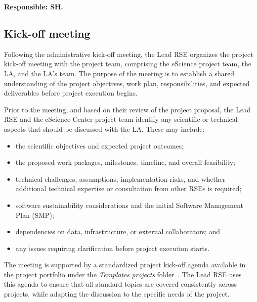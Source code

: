 \textbf{Responsible: SH.}

\subsection{Kick-off meeting}
\label{sec:init:kickoff}
Following the administrative kick-off meeting, the Lead RSE organizes the project kick-off meeting with the 
project team, comprising the eScience project team, the LA, and the LA's team. The purpose of the meeting is to 
establish a shared understanding of the project objectives, work plan, responsibilities, and expected deliverables 
before project execution begins.

Prior to the meeting, and based on their review of the project proposal, the Lead RSE and the eScience Center project 
team identify any scientific or technical aspects that should be discussed with the LA. These may include:
\vspace{-0.2cm}
\begin{itemize}
\item the scientific objectives and expected project outcomes;
\item the proposed work packages, milestones, timeline, and overall feasibility;
\item technical challenges, assumptions, implementation risks, and whether additional technical expertise or 
consultation from other RSEs is required; 
\item software sustainability considerations and the initial Software Management Plan (SMP);
\item dependencies on data, infrastructure, or external collaborators; and
\item any issues requiring clarification before project execution starts.
\end{itemize}
\vspace{-0.2cm}

The meeting is supported by a standardized project kick-off agenda available in the project portfolio under the 
\textit{Templates projects} folder~\cite{proj-portfolio}. The Lead RSE uses this agenda to ensure that all standard 
topics are covered consistently across projects, while adapting the discussion to the specific needs of the project.

